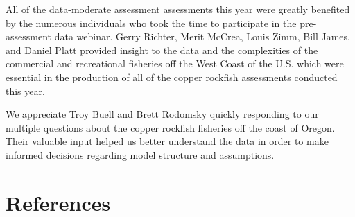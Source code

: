 \documentclass[11pt,
  english,
  a4paper,
]{article}
\begin{document}
\leavevmode\tagmcend\tagstructend\par


All of the data-moderate assessment assessments this year were greatly benefited by the numerous individuals who took the time to participate in the pre-assessment data webinar. Gerry Richter, Merit McCrea, Louis Zimm, Bill James, and Daniel Platt provided insight to the data and the complexities of the commercial and recreational fisheries off the West Coast of the U.S. which were essential in the production of all of the copper rockfish assessments conducted this year.

\leavevmode\tagmcend\tagstructend\par


We appreciate Troy Buell and Brett Rodomsky quickly responding to our multiple questions about the copper rockfish fisheries off the coast of Oregon. Their valuable input helped us better understand the data in order to make informed decisions regarding model structure and assumptions.

\leavevmode\tagmcend\tagstructend\par

\clearpage


\hypertarget{references}{%
\section{References}\label{references}}

\leavevmode\tagmcend\tagstructend

\end{document}
